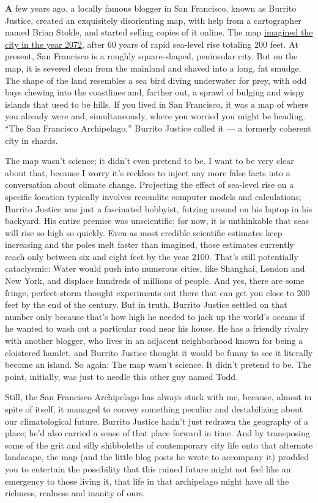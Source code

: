 \textbf{A} few years ago, a locally famous blogger in San Francisco,
known as Burrito Justice, created an exquisitely disorienting map, with
help from a cartographer named Brian Stokle, and started selling copies
of it online. The map \href{https://burritojustice.com/200ft/}{imagined
the city in the year 2072}, after 60 years of rapid sea-level rise
totaling 200 feet. At present, San Francisco is a roughly square-shaped,
peninsular city. But on the map, it is severed clean from the mainland
and shaved into a long, fat smudge. The shape of the land resembles a
sea bird diving underwater for prey, with odd bays chewing into the
coastlines and, farther out, a sprawl of bulging and wispy islands that
used to be hills. If you lived in San Francisco, it was a map of where
you already were and, simultaneously, where you worried you might be
heading. ``The San Francisco Archipelago,'' Burrito Justice called it
--- a formerly coherent city in shards.

The map wasn't science; it didn't even pretend to be. I want to be very
clear about that, because I worry it's reckless to inject any more false
facts into a conversation about climate change. Projecting the effect of
sea-level rise on a specific location typically involves recondite
computer models and calculations; Burrito Justice was just a fascinated
hobbyist, futzing around on his laptop in his backyard. His entire
premise was unscientific; for now, it is unthinkable that seas will rise
so high so quickly. Even as most credible scientific estimates keep
increasing and the poles melt faster than imagined, those estimates
currently reach only between six and eight feet by the year 2100. That's
still potentially cataclysmic: Water would push into numerous cities,
like Shanghai, London and New York, and displace hundreds of millions of
people. And yes, there are some fringe, perfect-storm thought
experiments out there that can get you close to 200 feet by the end of
the century. But in truth, Burrito Justice settled on that number only
because that's how high he needed to jack up the world's oceans if he
wanted to wash out a particular road near his house. He has a friendly
rivalry with another blogger, who lives in an adjacent neighborhood
known for being a cloistered hamlet, and Burrito Justice thought it
would be funny to see it literally become an island. So again: The map
wasn't science. It didn't pretend to be. The point, initially, was just
to needle this other guy named Todd.

Still, the San Francisco Archipelago has always stuck with me, because,
almost in spite of itself, it managed to convey something peculiar and
destabilizing about our climatological future. Burrito Justice hadn't
just redrawn the geography of a place; he'd also carried a sense of that
place forward in time. And by transposing some of the grit and silly
shibboleths of contemporary city life onto that alternate landscape, the
map (and the little blog posts he wrote to accompany it) prodded you to
entertain the possibility that this ruined future might not feel like an
emergency to those living it, that life in that archipelago might have
all the richness, realness and inanity of ours.

